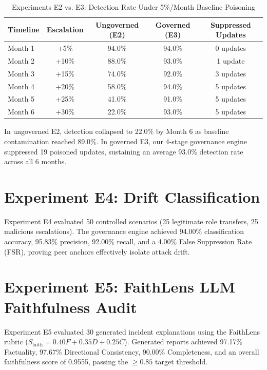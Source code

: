 \documentclass[12pt,a4paper]{report}
\begin{document}
\begin{table}[htbp]
\caption{Experiments E2 vs. E3: Detection Rate Under 5\%/Month Baseline Poisoning}
\label{tab:e2_e3_results_report}
\centering
\begin{tabular}{lcccc}
\toprule
\textbf{Timeline} & \textbf{Escalation} & \textbf{Ungoverned (E2)} & \textbf{Governed (E3)} & \textbf{Suppressed Updates} \\
\midrule
Month 1 & +5\% & 94.0\% & 94.0\% & 0 updates \\
Month 2 & +10\% & 88.0\% & 93.0\% & 1 update \\
Month 3 & +15\% & 74.0\% & 92.0\% & 3 updates \\
Month 4 & +20\% & 58.0\% & 94.0\% & 5 updates \\
Month 5 & +25\% & 41.0\% & 91.0\% & 5 updates \\
Month 6 & +30\% & 22.0\% & 93.0\% & 5 updates \\
\bottomrule
\end{tabular}
\end{table}

In ungoverned E2, detection collapsed to 22.0\% by Month 6 as baseline contamination reached 89.0\%. In governed E3, our 4-stage governance engine suppressed 19 poisoned updates, sustaining an average 93.0\% detection rate across all 6 months.

\section{Experiment E4: Drift Classification}
Experiment E4 evaluated 50 controlled scenarios (25 legitimate role transfers, 25 malicious escalations). The governance engine achieved 94.00\% classification accuracy, 95.83\% precision, 92.00\% recall, and a 4.00\% False Suppression Rate (FSR), proving peer anchors effectively isolate attack drift.

\section{Experiment E5: FaithLens LLM Faithfulness Audit}
Experiment E5 evaluated 30 generated incident explanations using the FaithLens rubric ($S_{\text{faith}} = 0.40 F + 0.35 D + 0.25 C$). Generated reports achieved 97.17\% Factuality, 97.67\% Directional Consistency, 90.00\% Completeness, and an overall faithfulness score of 0.9555, passing the $\ge 0.85$ target threshold.

\end{document}
